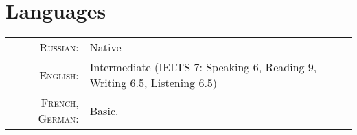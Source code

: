 \documentclass[a4paper,10pt]{article} %
\begin{document}
\vspace{1.2cm}


\section{Languages}

\begin{tabular}{rl}
\textsc{Russian:} & Native\\

\textsc{English:} & Intermediate (IELTS 7: Speaking 6, Reading 9, Writing 6.5, Listening 6.5)\\

\textsc{French, German:} & Basic.\\
\end{tabular}


%
%
%
%
%
%
%
\end{document}
